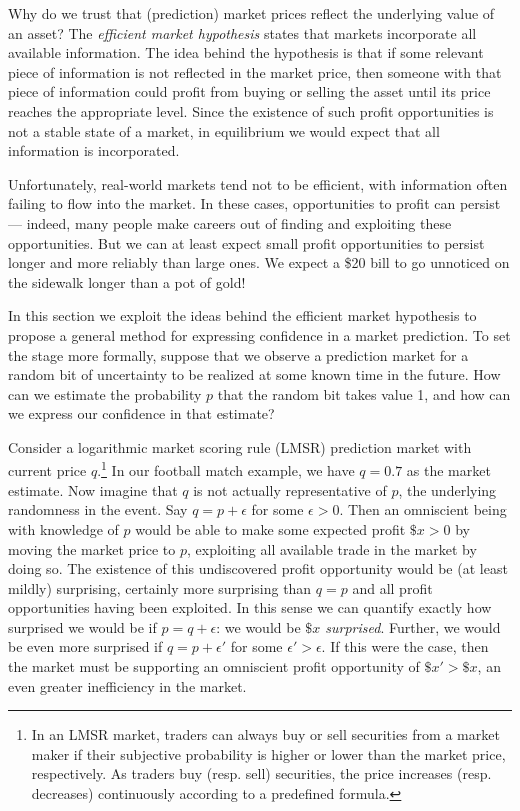 \documentclass[sigconf,anonymous]{aamas}   %
\begin{document}
Why do we trust that (prediction) market prices reflect the underlying value of an asset? The \emph{efficient market hypothesis} states that markets incorporate all available information. The idea behind the hypothesis is that if some relevant piece of information is not reflected in the market price, then someone with that piece of information could profit from buying or selling the asset until its price reaches the appropriate level. Since the existence of such profit opportunities is not a stable state of a market, in equilibrium we would expect that all information is incorporated. 

Unfortunately, real-world markets tend not to be efficient, with information often failing to flow into the market. In these cases, opportunities to profit can persist --- indeed, many people make careers out of finding and exploiting these opportunities. But we can at least expect small profit opportunities to persist longer and more reliably than large ones. We expect a \$20 bill to go unnoticed on the sidewalk longer than a pot of gold!

In this section we exploit the ideas behind the efficient market hypothesis to propose a general method for expressing confidence in a market prediction. To set the stage more formally, suppose that we observe a prediction market for a random bit of uncertainty to be realized at some known time in the future. How can we estimate the probability $p$ that the random bit takes value 1, and how can we express our confidence in that estimate?

Consider a logarithmic market scoring rule (LMSR) prediction market with current price $q$.\footnote{In an LMSR market, traders can always buy or sell securities from a market maker if their subjective probability is higher or lower than the market price, respectively. As traders buy (resp. sell) securities, the price increases (resp. decreases) continuously according to a predefined formula.} In our football match example, we have $q=0.7$ as the market estimate. Now imagine that $q$ is not actually representative of $p$, the underlying randomness in the event. Say $q = p+\epsilon$ for some $\epsilon >0$. Then an omniscient being with knowledge of $p$ would be able to make some expected profit $\$x>0$ by moving the market price to $p$, exploiting all available trade in the market by doing so. The existence of this undiscovered profit opportunity would be (at least mildly) surprising, certainly more surprising than $q=p$ and all profit opportunities having been exploited.
In this sense we can quantify exactly how surprised we would be if $p=q+\epsilon$: we would be \emph{$\$x$ surprised}. Further, we would be even more surprised if $q = p+\epsilon'$ for some $\epsilon'>\epsilon$. If this were the case, then the market must be supporting an omniscient profit opportunity of $\$x'>\$x$, an even greater inefficiency in the market.
\end{document}
